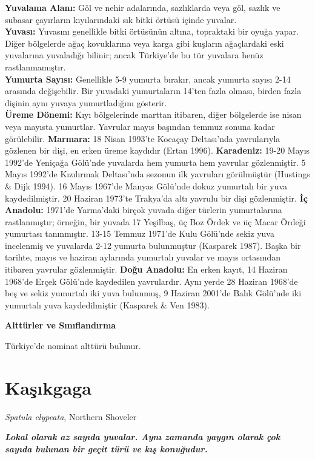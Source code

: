 \documentclass[
  letterpaper,
  DIV=11,
  numbers=noendperiod]{scrreprt}
\begin{document}
\textbf{Yuvalama Alanı:} Göl ve nehir adalarında, sazlıklarda veya göl,
sazlık ve subasar çayırların kıyılarındaki sık bitki örtüsü içinde
yuvalar.\\
\textbf{Yuvası:} Yuvasını genellikle bitki örtüsünün altına, topraktaki
bir oyuğa yapar. Diğer bölgelerde ağaç kovuklarına veya karga gibi
kuşların ağaçlardaki eski yuvalarına yuvaladığı bilinir; ancak
Türkiye'de bu tür yuvalara henüz rastlanmamıştır.\\
\textbf{Yumurta Sayısı:} Genellikle 5-9 yumurta bırakır, ancak yumurta
sayısı 2-14 arasında değişebilir. Bir yuvadaki yumurtaların 14'ten fazla
olması, birden fazla dişinin aynı yuvaya yumurtladığını gösterir.\\
\textbf{Üreme Dönemi:} Kıyı bölgelerinde marttan itibaren, diğer
bölgelerde ise nisan veya mayısta yumurtlar. Yavrular mayıs başından
temmuz sonuna kadar görülebilir. \textbf{Marmara:} 18 Nisan 1993'te
Kocaçay Deltası'nda yavrularıyla gözlenen bir dişi, en erken üreme
kaydıdır (Ertan 1996). \textbf{Karadeniz:} 19-20 Mayıs 1992'de Yeniçağa
Gölü'nde yuvalarda hem yumurta hem yavrular gözlenmiştir. 5 Mayıs
1992'de Kızılırmak Deltası'nda sezonun ilk yavruları görülmüştür
(Hustings \& Dijk 1994). 16 Mayıs 1967'de Manyas Gölü'nde dokuz
yumurtalı bir yuva kaydedilmiştir. 20 Haziran 1973'te Trakya'da altı
yavrulu bir dişi gözlenmiştir. \textbf{İç Anadolu:} 1971'de Yarma'daki
birçok yuvada diğer türlerin yumurtalarına rastlanmıştır; örneğin, bir
yuvada 17 Yeşilbaş, üç Boz Ördek ve üç Macar Ördeği yumurtası
tanınmıştır. 13-15 Temmuz 1971'de Kulu Gölü'nde sekiz yuva incelenmiş ve
yuvalarda 2-12 yumurta bulunmuştur (Kasparek 1987). Başka bir tarihte,
mayıs ve haziran aylarında yumurtalı yuvalar ve mayıs ortasından
itibaren yavrular gözlenmiştir. \textbf{Doğu Anadolu:} En erken kayıt,
14 Haziran 1968'de Erçek Gölü'nde kaydedilen yavrulardır. Aynı yerde 28
Haziran 1968'de beş ve sekiz yumurtalı iki yuva bulunmuş, 9 Haziran
2001'de Balık Gölü'nde iki yumurtalı yuva kaydedilmiştir (Kasparek \&
Ven 1983).

\textbf{Alttürler ve Sınıflandırma}

Türkiye'de nominat alttürü bulunur.

\section{Kaşıkgaga}\label{kaux15fux131kgaga}

\emph{Spatula clypeata}, Northern Shoveler

\textbf{\emph{Lokal olarak az sayıda yuvalar. Aynı zamanda yaygın olarak
çok sayıda bulunan bir geçit türü ve kış konuğudur.}}
\end{document}
